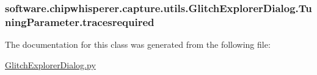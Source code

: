 \subsubsection[{tracesrequired}]{\setlength{\rightskip}{0pt plus 5cm}software.\+chipwhisperer.\+capture.\+utils.\+Glitch\+Explorer\+Dialog.\+Tuning\+Parameter.\+tracesrequired}\label{classsoftware_1_1chipwhisperer_1_1capture_1_1utils_1_1GlitchExplorerDialog_1_1TuningParameter_aaccd49599dfda0cd03799b20ede4d1bb}


The documentation for this class was generated from the following file\+:\begin{DoxyCompactItemize}
\item 
\hyperlink{GlitchExplorerDialog_8py}{Glitch\+Explorer\+Dialog.\+py}\end{DoxyCompactItemize}
